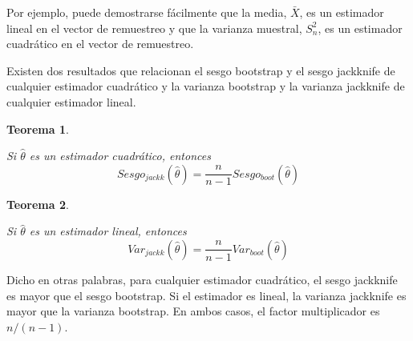\documentclass[
]{book}
\theoremstyle{break}
\newtheorem{theorem}{Teorema}[chapter]
\theoremstyle{nonumberplain}
\begin{document}
Por ejemplo, puede demostrarse fácilmente que la media, \(\bar{X}\),
es un estimador lineal en el vector de remuestreo y que la varianza
muestral, \(S_n^2\), es un estimador cuadrático en el vector de
remuestreo.

Existen dos resultados que relacionan el sesgo bootstrap y el sesgo
jackknife de cualquier estimador cuadrático y la varianza bootstrap y la
varianza jackknife de cualquier estimador lineal.

\begin{theorem}
\protect\hypertarget{thm:jack-boot-sesgo}{}\label{thm:jack-boot-sesgo} \vspace{0.5cm}

Si \(\hat{\theta}\) es un estimador cuadrático, entonces
\[Sesgo_{jackk}\left( \hat{\theta} \right) =\frac{n}{n-1}Sesgo_{boot}\left( 
\hat{\theta} \right)\]
\end{theorem}

\begin{theorem}
\protect\hypertarget{thm:jack-boot-precision}{}\label{thm:jack-boot-precision} \vspace{0.5cm}

Si \(\hat{\theta}\) es un estimador lineal, entonces
\[Var_{jackk}\left( \hat{\theta} \right) =\frac{n}{n-1}Var_{boot}\left( \hat{
\theta} \right)\]
\end{theorem}

Dicho en otras palabras, para cualquier estimador cuadrático, el sesgo
jackknife es mayor que el sesgo bootstrap. Si el estimador es lineal, la
varianza jackknife es mayor que la varianza bootstrap. En ambos casos,
el factor multiplicador es \(n/(n-1)\).
\end{document}

